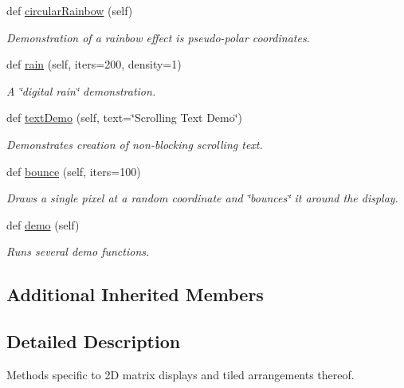 \begin{DoxyCompactItemize}
def \hyperlink{classglowbit_1_1glowbitMatrix_adf29bdb4294bcf27ae560130b0fcae35}{circular\+Rainbow} (self)
\begin{DoxyCompactList}\small\item\em Demonstration of a rainbow effect is pseudo-\/polar coordinates. \end{DoxyCompactList}\item 
def \hyperlink{classglowbit_1_1glowbitMatrix_a088608e2586a76f09eb7312f2155f0b8}{rain} (self, iters=200, density=1)
\begin{DoxyCompactList}\small\item\em A \char`\"{}digital rain\char`\"{} demonstration. \end{DoxyCompactList}\item 
def \hyperlink{classglowbit_1_1glowbitMatrix_a6232220b12c86c7ec361cde374419ac4}{text\+Demo} (self, text=\char`\"{}Scrolling Text Demo\char`\"{})
\begin{DoxyCompactList}\small\item\em Demonstrates creation of non-\/blocking scrolling text. \end{DoxyCompactList}\item 
\mbox{\label{classglowbit_1_1glowbitMatrix_a2563367a0457da5d91001f3a810bf0fd}} 
def \hyperlink{classglowbit_1_1glowbitMatrix_a2563367a0457da5d91001f3a810bf0fd}{bounce} (self, iters=100)
\begin{DoxyCompactList}\small\item\em Draws a single pixel at a random coordinate and \char`\"{}bounces\char`\"{} it around the display. \end{DoxyCompactList}\item 
\mbox{\label{classglowbit_1_1glowbitMatrix_a2b32b49b418d50de484ef8487a77d082}} 
def \hyperlink{classglowbit_1_1glowbitMatrix_a2b32b49b418d50de484ef8487a77d082}{demo} (self)
\begin{DoxyCompactList}\small\item\em Runs several demo functions. \end{DoxyCompactList}\end{DoxyCompactItemize}
\subsection*{Additional Inherited Members}


\subsection{Detailed Description}
Methods specific to 2D matrix displays and tiled arrangements thereof. 


